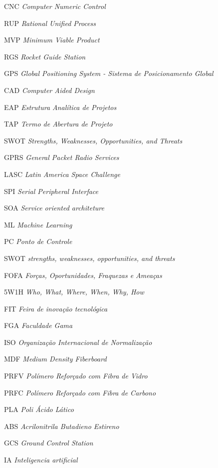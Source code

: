 \begin{siglas}
  \item [CNC] \textit{Computer Numeric Control}
  \item [RUP] \textit{Rational Unified Process}
  \item [MVP] \textit{Minimum Viable Product}
  \item [RGS] \textit{Rocket Guide Station}
  \item [GPS] \textit{Global Positioning System - Sistema de Posicionamento Global}
  \item [CAD] \textit{Computer Aided Design}
  \item [EAP] \textit{ Estrutura Analítica de Projetos}
  \item [TAP] \textit{Termo de Abertura de Projeto}
  \item [SWOT] \textit{Strengths, Weaknesses, Opportunities, and Threats}
  \item [GPRS] \textit{General Packet Radio Services}
  \item [LASC] \textit{Latin America Space Challenge}
  \item [SPI] \textit{Serial Peripheral Interface}
  \item [SOA] \textit{Service oriented architeture}
  \item [ML] \textit{Machine Learning}
  \item [PC] \textit{Ponto de Controle}
  \item [SWOT] \textit{strengths, weaknesses, opportunities, and threats}
  \item [FOFA] \textit{Forças, Oportunidades, Fraquezas e Ameaças}
  \item [5W1H] \textit{Who, What, Where, When, Why, How}
  \item [FIT] \textit{Feira de inovação tecnológica}
  \item [FGA] \textit{Faculdade Gama}
  \item [ISO] \textit{Organização Internacional de Normalização}
  \item [MDF] \textit{Medium Density Fiberboard}
  \item [PRFV] \textit{Polímero Reforçado com Fibra de Vidro}
  \item [PRFC] \textit{Polímero Reforçado com Fibra de Carbono}
  \item [PLA] \textit{Poli Ácido Lático}
  \item [ABS] \textit{Acrilonitrila Butadieno Estireno}
  \item [GCS] \textit{Ground Control Station}
  \item [IA] \textit{Inteligencia artificial}

\end{siglas}
